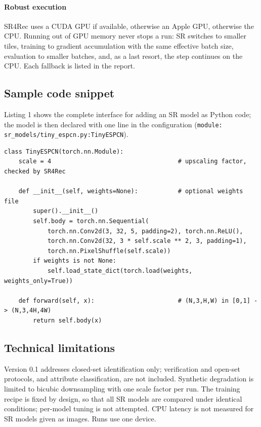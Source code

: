 \documentclass[preprint,12pt]{elsarticle}
\begin{document}
\paragraph{Robust execution} SR4Rec uses a CUDA GPU if available, otherwise an Apple GPU, otherwise
the CPU. Running out of GPU memory never stops a run: SR switches to smaller tiles, training to
gradient accumulation with the same effective batch size, evaluation to smaller batches, and, as a
last resort, the step continues on the CPU. Each fallback is listed in the report.

\subsection{Sample code snippet}
\label{sec:snippet}

Listing 1 shows the complete interface for adding an SR model as Python code; the
model is then declared with one line in the configuration
(\texttt{module: sr\_models/tiny\_espcn.py:TinyESPCN}).

{\scriptsize
\begin{verbatim}
class TinyESPCN(torch.nn.Module):
    scale = 4                                   # upscaling factor, checked by SR4Rec

    def __init__(self, weights=None):           # optional weights file
        super().__init__()
        self.body = torch.nn.Sequential(
            torch.nn.Conv2d(3, 32, 5, padding=2), torch.nn.ReLU(),
            torch.nn.Conv2d(32, 3 * self.scale ** 2, 3, padding=1),
            torch.nn.PixelShuffle(self.scale))
        if weights is not None:
            self.load_state_dict(torch.load(weights, weights_only=True))

    def forward(self, x):                       # (N,3,H,W) in [0,1] -> (N,3,4H,4W)
        return self.body(x)
\end{verbatim}}
\label{lst:module}

\subsection{Technical limitations}
\label{sec:limitations}

Version 0.1 addresses closed-set identification only; verification and open-set protocols, and
attribute classification, are not included. Synthetic degradation is limited to bicubic
downsampling with one scale factor per run. The training recipe is fixed by design, so that all SR models are compared under identical
conditions; per-model tuning is not attempted. CPU latency is not measured for SR models given as images. Runs use one
device.
\end{document}
